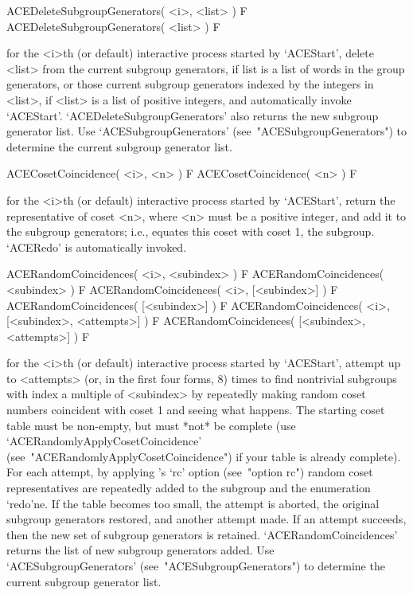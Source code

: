 \>ACEDeleteSubgroupGenerators( <i>, <list> ) F
\>ACEDeleteSubgroupGenerators( <list> ) F

for the <i>th (or  default)  interactive  {\ACE}  process  started  by
`ACEStart', delete <list> from the  current  subgroup  generators,  if
list is a list of words in the  group  generators,  or  those  current
subgroup generators indexed by the integers in <list>, if <list> is  a
list  of  positive  integers,  and  automatically  invoke  `ACEStart'.
`ACEDeleteSubgroupGenerators' also returns the new subgroup  generator
list.  Use  `ACESubgroupGenerators'  (see~"ACESubgroupGenerators")  to
determine the current subgroup generator list.

\>ACECosetCoincidence( <i>, <n> ) F
\>ACECosetCoincidence( <n> ) F

for the <i>th (or  default)  interactive  {\ACE}  process  started  by
`ACEStart', return the representative of coset <n>, where <n> must  be
a positive integer, and add  it  to  the  subgroup  generators;  i.e.,
equates  this  coset  with  coset  1,  the  subgroup.   `ACERedo'   is
automatically invoked.

\>ACERandomCoincidences( <i>, <subindex> ) F
\>ACERandomCoincidences( <subindex> ) F
\>ACERandomCoincidences( <i>, [<subindex>] ) F
\>ACERandomCoincidences( [<subindex>] ) F
\>ACERandomCoincidences( <i>, [<subindex>, <attempts>] ) F
\>ACERandomCoincidences( [<subindex>, <attempts>] ) F

for the <i>th (or  default)  interactive  {\ACE}  process  started  by
`ACEStart', attempt up to <attempts> (or, in the first four forms,  8)
times to find nontrivial subgroups with index a multiple of <subindex>
by repeatedly making random coset numbers coincident with coset 1  and
seeing what happens. The starting coset table must be  non-empty,  but
must  *not*  be   complete   (use   `ACERandomlyApplyCosetCoincidence'
(see~"ACERandomlyApplyCosetCoincidence")  if  your  table  is  already
complete).  For  each  attempt,  by  applying  {\ACE}'s  `rc'   option
(see~"option rc") random coset representatives are repeatedly added to
the subgroup and the enumeration `redo'ne. If the  table  becomes  too
small, the  attempt  is  aborted,  the  original  subgroup  generators
restored, and another attempt made. If an attempt succeeds,  then  the
new set of subgroup generators  is  retained.  `ACERandomCoincidences'
returns   the   list   of   new   subgroup   generators   added.   Use
`ACESubgroupGenerators' (see~"ACESubgroupGenerators") to determine the
current subgroup generator list.

